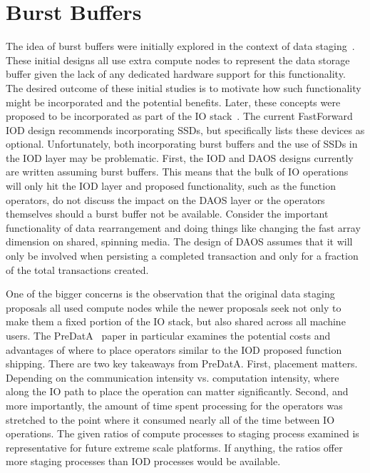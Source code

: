 \documentclass[conference]{IEEEtran}
\begin{document}
\section{Burst Buffers}
\label{sec:burst}

The idea of burst buffers were initially explored in the context of data
staging~\cite{abbasi:2007:datatap,Abbasi:2009:datatap,nisar:2008:staging,zheng:2010:predata}.
These initial designs all use extra compute nodes to represent the data storage
buffer given the lack of any dedicated hardware support for this functionality.
The desired outcome of these initial studies is to motivate how such
functionality might be incorporated and the potential benefits.  Later, these
concepts were proposed to be incorporated as part of the IO
stack~\cite{bent:2012:challenges,bent:2012:burst-buffer}.  The current
FastForward IOD design recommends incorporating SSDs, but specifically lists
these devices as optional. Unfortunately, both incorporating burst buffers and
the use of SSDs in the IOD layer may be problematic.  First, the IOD and DAOS
designs currently are written assuming burst buffers. This means that the
bulk of IO operations will only hit the IOD layer and proposed functionality,
such as the function operators, do not discuss the impact on the DAOS layer or
the operators themselves should a burst buffer not be available.  Consider the
important functionality of data rearrangement and doing things like changing
the fast array dimension on shared, spinning media.  The design of DAOS assumes
that it will only be involved when persisting a completed transaction and only
for a fraction of the total transactions created. 

One of the bigger concerns is the observation that the original data staging
proposals all used compute nodes while the newer proposals seek not only to
make them a fixed portion of the IO stack, but also shared across all machine
users. The PreDatA~\cite{zheng:2010:predata} paper in particular examines the
potential costs and advantages of where to place operators similar to the IOD
proposed function shipping. There are two key takeaways from PreDatA. First,
placement matters.  Depending on the communication intensity vs. computation
intensity, where along the IO path to place the operation can matter
significantly. Second, and more importantly, the amount of time spent
processing for the operators was stretched to the point where it consumed
nearly all of the time between IO operations. The given ratios of compute
processes to staging process examined is representative for future extreme
scale platforms. If anything, the ratios offer more staging processes than IOD
processes would be available.
\end{document}
